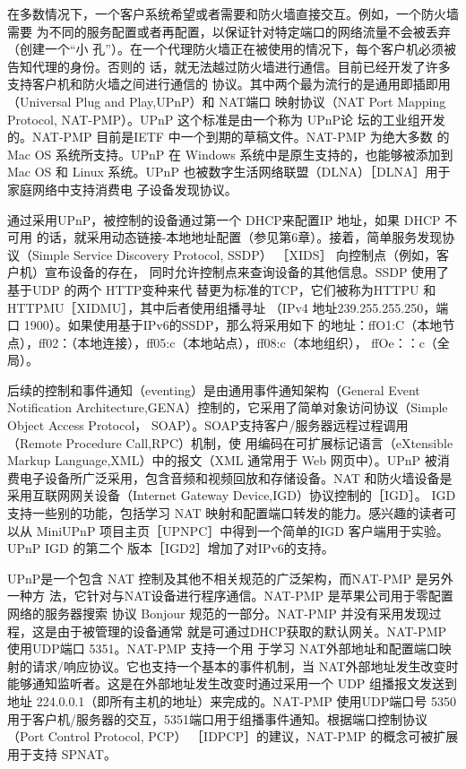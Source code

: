 在多数情况下，一个客户系统希望或者需要和防火墙直接交互。例如，一个防火墙需要
为不同的服务配置或者再配置，以保证针对特定端口的网络流量不会被丢弃（创建一个“小
孔”）。在一个代理防火墙正在被使用的情况下，每个客户机必须被告知代理的身份。否则的
话，就无法越过防火墙进行通信。目前已经开发了许多支持客户机和防火墙之间进行通信的
协议。其中两个最为流行的是通用即插即用（Universal Plug and Play,UPnP）和 NAT端口
映射协议（NAT Port Mapping Protocol, NAT-PMP）。UPnP 这个标准是由一个称为 UPnP论
坛的工业组开发的。NAT-PMP 目前是IETF 中一个到期的草稿文件。NAT-PMP 为绝大多数
的Mac OS 系统所支持。UPnP 在 Windows 系统中是原生支持的，也能够被添加到 Mac OS
和 Linux 系统。UPnP 也被数字生活网络联盟（DLNA）［DLNA］用于家庭网络中支持消费电
子设备发现协议。

通过采用UPnP，被控制的设备通过第一个 DHCP来配置IP 地址，如果 DHCP 不可用
的话，就采用动态链接-本地地址配置（参见第6章）。接着，简单服务发现协议（Simple
Service Discovery Protocol, SSDP） ［XIDS］ 向控制点（例如，客户机）宣布设备的存在，
同时允许控制点来查询设备的其他信息。SSDP 使用了基于UDP 的两个 HTTP变种来代
替更为标准的TCP，它们被称为HTTPU 和 HTTPMU［XIDMU］，其中后者使用组播寻址
（IPv4 地址239.255.255.250，端口 1900）。如果使用基于IPv6的SSDP，那么将采用如下
的地址：ffO1:C（本地节点），ff02：（本地连接），ff05:c（本地站点），ff08:c（本地组织），
ffOe：：c（全局）。

后续的控制和事件通知（eventing）是由通用事件通知架构（General Event Notification
Architecture,GENA）控制的，它采用了简单对象访问协议（Simple Object Access Protocol，
SOAP）。SOAP支持客户/服务器远程过程调用（Remote Procedure Call,RPC）机制，使
用编码在可扩展标记语言（eXtensible Markup Language,XML）中的报文（XML 通常用于
Web 网页中）。UPnP 被消费电子设备所广泛采用，包含音频和视频回放和存储设备。NAT
和防火墙设备是采用互联网网关设备（Internet Gateway Device,IGD）协议控制的［IGD］。
IGD 支持一些别的功能，包括学习 NAT 映射和配置端口转发的能力。感兴趣的读者可以从
MiniUPnP 项目主页［UPNPC］中得到一个简单的IGD 客户端用于实验。UPnP IGD 的第二个
版本［IGD2］增加了对IPv6的支持。

UPnP是一个包含 NAT 控制及其他不相关规范的广泛架构，而NAT-PMP 是另外一种方
法，它针对与NAT设备进行程序通信。NAT-PMP 是苹果公司用于零配置网络的服务器搜索
协议 Bonjour 规范的一部分。NAT-PMP 并没有采用发现过程，这是由于被管理的设备通常
就是可通过DHCP获取的默认网关。NAT-PMP 使用UDP端口 5351。NAT-PMP 支持一个用
于学习 NAT外部地址和配置端口映射的请求/响应协议。它也支持一个基本的事件机制，当
NAT外部地址发生改变时能够通知监听者。这是在外部地址发生改变时通过采用一个 UDP
组播报文发送到地址 224.0.0.1（即所有主机的地址）来完成的。NAT-PMP 使用UDP端口号
5350用于客户机/服务器的交互，5351端口用于组播事件通知。根据端口控制协议（Port
Control Protocol, PCP） ［IDPCP］的建议，NAT-PMP 的概念可被扩展用于支持 SPNAT。

